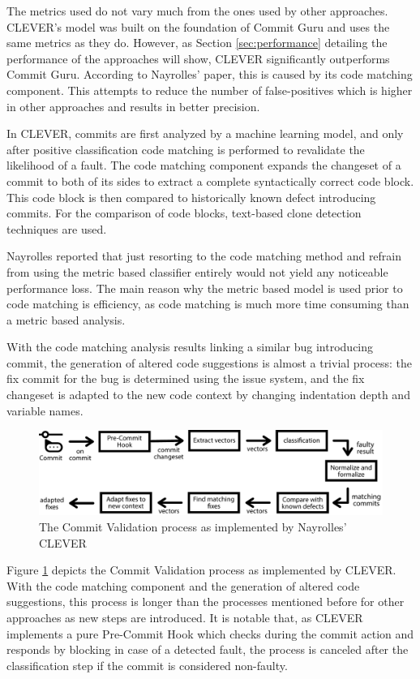 The metrics used do not vary much from the ones used by other approaches. CLEVER's model was built on the foundation of Commit Guru and uses the same metrics as they do. However, as Section \ref{sec:performance} detailing the performance of the approaches will show, CLEVER significantly outperforms Commit Guru. According to Nayrolles' paper, this is caused by its code matching component. This attempts to reduce the number of false-positives which is higher in other approaches and results in better precision.

In CLEVER, commits are first analyzed by a machine learning model, and only after positive classification code matching is performed to revalidate the likelihood of a fault. The code matching component expands the changeset of a commit to both of its sides to extract a complete syntactically correct code block. This code block is then compared to historically known defect introducing commits. For the comparison of code blocks, text-based clone detection techniques are used.

Nayrolles reported that just resorting to the code matching method and refrain from using the metric based classifier entirely would not yield any noticeable performance loss. The main reason why the metric based model is used prior to code matching is efficiency, as code matching is much more time consuming than a metric based analysis.

With the code matching analysis results linking a similar bug introducing commit, the generation of altered code suggestions is almost a trivial process: the fix commit for the bug is determined using the issue system, and the fix changeset is adapted to the new code context by changing indentation depth and variable names.

\begin{figure}[t]
	\centering
	\includegraphics[width=\textwidth]{images/commitvalidation-process/cleverprocess-pdf}
	\caption{The Commit Validation process as implemented by Nayrolles' CLEVER \cite{Nayrolles2018}}
	\label{fig:cvprocess-clever}
\end{figure}

Figure \ref{fig:cvprocess-clever} depicts the Commit Validation process as implemented by CLEVER. With the code matching component and the generation of altered code suggestions, this process is longer than the processes mentioned before for other approaches as new steps are introduced. It is notable that, as CLEVER implements a pure Pre-Commit Hook which checks during the commit action and responds by blocking in case of a detected fault, the process is canceled after the classification step if the commit is considered non-faulty.

